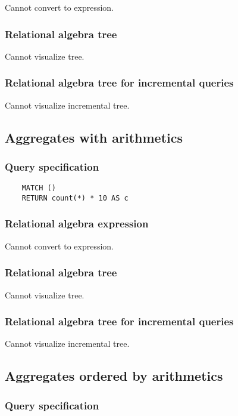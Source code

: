 	Cannot convert to expression.

	\subsubsection*{Relational algebra tree}

	Cannot visualize tree.

	\subsubsection*{Relational algebra tree for incremental queries}

	Cannot visualize incremental tree.
	\subsection{Aggregates with arithmetics}

	\subsubsection*{Query specification}

	\begin{lstlisting}
	MATCH ()
	RETURN count(*) * 10 AS c
	\end{lstlisting}


	\subsubsection*{Relational algebra expression}

	Cannot convert to expression.

	\subsubsection*{Relational algebra tree}

	Cannot visualize tree.

	\subsubsection*{Relational algebra tree for incremental queries}

	Cannot visualize incremental tree.
	\subsection{Aggregates ordered by arithmetics}

	\subsubsection*{Query specification}

